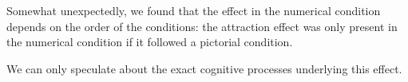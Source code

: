 \documentclass[11pt,a4paper]{article}
\begin{document}
Somewhat unexpectedly, we found that the effect in the numerical condition depends on the order of the conditions: the attraction effect was only present in the numerical condition if it followed a pictorial condition. 

We can only speculate about the exact cognitive processes underlying this effect.



















\newpage


\end{document}

